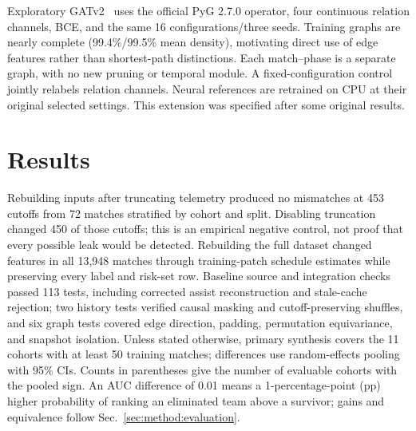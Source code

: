 \documentclass[sigconf,anonymous,nonacm]{acmart}
\begin{document}
Exploratory GATv2~\cite{Brody22} uses the official PyG 2.7.0 operator, four continuous relation channels, BCE, and the same 16 configurations/three seeds. Training graphs are nearly complete (99.4\%/99.5\% mean density), motivating direct use of edge features rather than shortest-path distinctions. Each match--phase is a separate graph, with no new pruning or temporal module. A fixed-configuration control jointly relabels relation channels. Neural references are retrained on CPU at their original selected settings. This extension was specified after some original results.


\section{Results}
\label{sec:results}

Rebuilding inputs after truncating telemetry produced no mismatches at 453 cutoffs from 72 matches stratified by cohort and split. Disabling truncation changed 450 of those cutoffs; this is an empirical negative control, not proof that every possible leak would be detected. Rebuilding the full dataset changed features in all 13,948 matches through training-patch schedule estimates while preserving every label and risk-set row. Baseline source and integration checks passed 113 tests, including corrected assist reconstruction and stale-cache rejection; two history tests verified causal masking and cutoff-preserving shuffles, and six graph tests covered edge direction, padding, permutation equivariance, and snapshot isolation.
Unless stated otherwise, primary synthesis covers the 11 cohorts with at least 50 training matches; differences use random-effects pooling with 95\% CIs. Counts in parentheses give the number of evaluable cohorts with the pooled sign.
An AUC difference of 0.01 means a 1-percentage-point (pp) higher probability of ranking an eliminated team above a survivor; gains and equivalence follow Sec.~\ref{sec:method:evaluation}.
\end{document}
